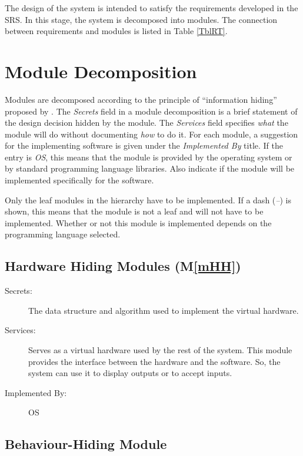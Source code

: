 \documentclass[12pt, titlepage]{article}
\newcommand{\mref}[1]{M\ref{#1}}
\begin{document}
The design of the system is intended to satisfy the requirements developed in
the SRS. In this stage, the system is decomposed into modules. The connection
between requirements and modules is listed in Table \ref{TblRT}.

\section{Module Decomposition} \label{SecMD}

Modules are decomposed according to the principle of ``information hiding''
proposed by \citet{ParnasEtAl1984}. The \emph{Secrets} field in a module
decomposition is a brief statement of the design decision hidden by the
module. The \emph{Services} field specifies \emph{what} the module will do
without documenting \emph{how} to do it. For each module, a suggestion for the
implementing software is given under the \emph{Implemented By} title. If the
entry is \emph{OS}, this means that the module is provided by the operating
system or by standard programming language libraries.  Also indicate if the
module will be implemented specifically for the software.

Only the leaf modules in the
hierarchy have to be implemented. If a dash (\emph{--}) is shown, this means
that the module is not a leaf and will not have to be implemented. Whether or
not this module is implemented depends on the programming language
selected.

\subsection{Hardware Hiding Modules (\mref{mHH})}

\begin{description}
\item[Secrets:]The data structure and algorithm used to implement the virtual
  hardware.
\item[Services:]Serves as a virtual hardware used by the rest of the
  system. This module provides the interface between the hardware and the
  software. So, the system can use it to display outputs or to accept inputs.
\item[Implemented By:] OS
\end{description}

\subsection{Behaviour-Hiding Module}
\end{document}
